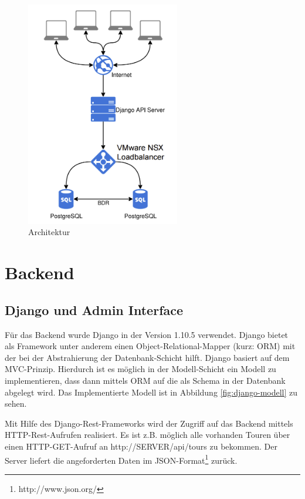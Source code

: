 \documentclass[12pt,a4paper,ngerman,english]{report}
\begin{document}
\begin{figure}[h]
	\centering
	\includegraphics[width=0.6\textwidth]{img/architecture.png}
	\caption{Architektur}
	\label{fig:architecture}
\end{figure}


\section{Backend}
\subsection{Django und Admin Interface}\label{sec:django-und-admin-interface}
Für das Backend wurde Django in der Version 1.10.5 verwendet. Django bietet als Framework unter anderem einen Object-Relational-Mapper (kurz: ORM) mit der bei der Abstrahierung der Datenbank-Schicht hilft. Django basiert auf dem MVC-Prinzip. Hierdurch ist es möglich in der Modell-Schicht ein Modell zu implementieren, dass dann mittels ORM auf die als Schema in der Datenbank abgelegt wird. Das Implementierte Modell ist in Abbildung \ref{fig:django-modell} zu sehen.

Mit Hilfe des  Django-Rest-Frameworks wird der Zugriff auf das Backend mittels HTTP-Rest-Aufrufen realisiert. Es ist z.B. möglich alle vorhanden Touren über einen HTTP-GET-Aufruf an http://SERVER/api/tours  zu bekommen. Der Server liefert die angeforderten Daten im JSON-Format\footnote{http://www.json.org/} zurück.
\end{document}
